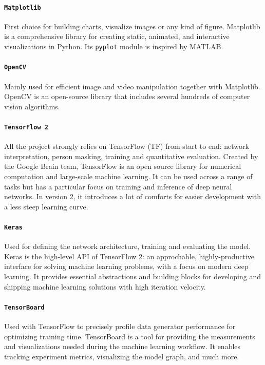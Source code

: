 \paragraph*{\texttt{Matplotlib}}
First choice for building charts, visualize images or any kind of figure. Matplotlib is a comprehensive library for creating static, animated, and interactive visualizations in Python. Its \texttt{pyplot} module is inspired by MATLAB.

\paragraph*{\texttt{OpenCV}}
Mainly used for efficient image and video manipulation together with Matplotlib. OpenCV is an open-source library that includes several hundreds of computer vision algorithms.

\paragraph*{\texttt{TensorFlow 2}}
All the project strongly relies on TensorFlow (TF) from start to end: network interpretation, person masking, training and quantitative evaluation. Created by the Google Brain team, TensorFlow is an open source library for numerical computation and large-scale machine learning. It can be used across a range of tasks but has a particular focus on training and inference of deep neural networks. In version 2, it introduces a lot of comforts for easier development with a less steep learning curve.

\paragraph*{\texttt{Keras}}
Used for defining the network architecture, training and evaluating the model. Keras is the high-level API of TensorFlow 2: an approchable, highly-productive interface for solving machine learning problems, with a focus on modern deep learning. It provides essential abstractions and building blocks for developing and shipping machine learning solutions with high iteration velocity.

\paragraph*{\texttt{TensorBoard}}
Used with TensorFlow to precisely profile data generator performance for optimizing training time. TensorBoard is a tool for providing the measurements and visualizations needed during the machine learning workflow. It enables tracking experiment metrics, visualizing the model graph, and much more.

